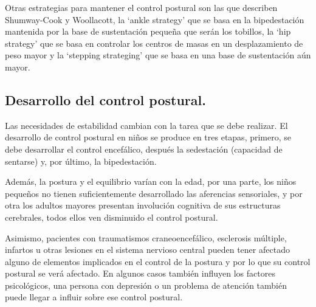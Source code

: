 Otras estrategias para mantener el control postural son las que describen Shumway-Cook y Woollacott, la ‘ankle strategy’ que se basa en la bipedestación mantenida por la base de sustentación pequeña que serán los tobillos, la ‘hip strategy’ que se basa en controlar los centros de masas en un desplazamiento de peso mayor y la ‘stepping strateging’ que se basa en una base de sustentación aún mayor.

\subsection{Desarrollo del control postural.} 
Las necesidades de estabilidad cambian con la tarea que se debe realizar. El desarrollo de control postural en niños se produce en tres etapas, primero, se debe desarrollar el control encefálico, después la sedestación (capacidad de sentarse) y, por último, la bipedestación.

Además, la postura y el equilibrio varían con la edad, por una parte, los niños pequeños\cite{Libro3_pediatria} no tienen suficientemente desarrollado las aferencias sensoriales, y por otra los adultos mayores\cite{Libro4_mayores} presentan involución cognitiva de sus estructuras cerebrales, todos ellos ven disminuido el control postural.

Asimismo, pacientes con traumatismos craneoencefálico, esclerosis múltiple, infartos u otras lesiones en el sistema nervioso central pueden tener afectado alguno de elementos implicados en el control de la postura y por lo que su control postural se verá afectado. En algunos casos también influyen los factores psicológicos, una persona con depresión o un problema de atención también puede llegar a influir sobre ese control postural.

